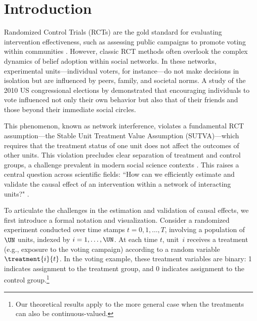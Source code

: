 \section{Introduction}
\label{sec:Intro}
% 
Randomized Control Trials (RCTs) are the gold standard for evaluating intervention effectiveness, such as assessing public campaigns to promote voting within communities \citep{imbens2015causal}. However, classic RCT methods often overlook the complex dynamics of belief adoption within social networks. In these networks, experimental units—individual voters, for instance—do not make decisions in isolation but are influenced by peers, family, and societal norms. A study of the 2010 US congressional elections by \cite{bond201261} demonstrated that encouraging individuals to vote influenced not only their own behavior but also that of their friends and those beyond their immediate social circles.

This phenomenon, known as network interference, violates a fundamental RCT assumption—the Stable Unit Treatment Value Assumption (SUTVA)—which requires that the treatment status of one unit does not affect the outcomes of other units. This violation precludes clear separation of treatment and control groups, a challenge prevalent in modern social science contexts \citep{imbens2024causal}. This raises a central question across scientific fields: ``How can we efficiently estimate and validate the causal effect of an intervention within a network of interacting units?" \citep{eckles2016design,cai2015social,abaluck2022impact,ogburn2024causal}.

To articulate the challenges in the estimation and validation of causal effects, we first introduce a formal notation and visualization. Consider a randomized experiment conducted over time stamps $t = 0, 1, \ldots, T$, involving a population of $\UN$ units, indexed by $i = 1, \ldots, \UN$. At each time $t$, unit~$i$ receives a treatment (e.g., exposure to the voting campaign) according to a random variable $\treatment{i}{t}$. In the voting example, these treatment variables are binary: 1 indicates assignment to the treatment group, and 0 indicates assignment to the control group.\footnote{Our theoretical results apply to the more general case when the treatments can also be continuous-valued.}

